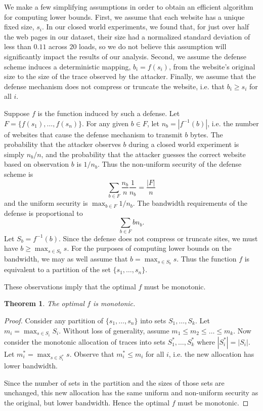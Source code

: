 \documentclass[10pt,journal]{IEEEtran}
\newtheorem{theorem}{Theorem}
\begin{document}
We make a few simplifying assumptions in order to obtain an efficient
algorithm for computing lower bounds.  First, we assume that each
website has a unique fixed size, $s_i$.  In our closed world
experiments, we found that, for just over half the web pages in our
dataset, their size had a normalized standard deviation of less than
$0.11$ across $20$ loads, so we do not believe this assumption will
significantly impact the results of our analysis.  Second, we assume
the defense scheme induces a deterministic mapping, $b_i=f(s_i)$, from
the website's original size to the size of the trace observed by the
attacker.  Finally, we assume that the defense mechanism does not
compress or truncate the website, i.e. that $b_i\geq s_i$ for all $i$.

Suppose $f$ is the function induced by such a defense.  Let
$F=\{f(s_1),\dots,f(s_n)\}$.  For any given $b\in F$, let
$n_b=|f^{-1}(b)|$, i.e. the number of websites that cause the defense
mechanism to transmit $b$ bytes.  The probability that the attacker
observes $b$ during a closed world experiment is simply $n_b/n$, and
the probability that the attacker guesses the correct website based on
observation $b$ is $1/n_b$.  Thus the non-uniform security of the
defense scheme is
\[
\sum_{b\in F} \frac{n_b}{n}\frac{1}{n_b}=\frac{|F|}{n}
\]
and the uniform security is $\max_{b\in F} 1/n_b$.  The bandwidth requirements of
the defense is proportional to
\[
\sum_{b\in F}bn_b.
\]
Let $S_b=f^{-1}(b)$.  Since the defense does not compress or truncate
sites, we must have $b\geq \max_{s\in S_b}s$.  For the purposes of computing
lower bounds on the bandwidth, we may as well assume that $b=\max_{s\in S_b} s$.
Thus the function $f$ is equivalent to a partition of the set
$\{s_1,\dots,s_n\}$.

These observations imply that the optimal $f$ must be monotonic.
\begin{theorem}\label{th:contiguous}
  The optimal $f$ is monotonic.
\end{theorem}
\begin{proof}
Consider any partition of $\{s_1,\dots,s_n\}$ into sets $S_1, \dots,
S_k$.  Let $m_i=\max_{s\in S_i} S_i$. Without loss of generality,
assume $m_1 \leq m_2 \leq \dots \leq m_k$. Now consider the monotonic
allocation of traces into sets $S^*_1, \dots, S^*_{k}$ where $|S^*_i|
= |S_i|$. Let $m^*_i=\max_{s\in S^*_i}s$. Observe that $m^*_i \leq
m_i$ for all $i$, i.e. the new allocation has lower bandwidth.

Since the number of sets in the partition and the sizes of those sets
are unchanged, this new allocation has the same uniform and
non-uniform security as the original, but lower bandwidth.  Hence the
optimal $f$ must be monotonic.
\end{proof}
\end{document}
